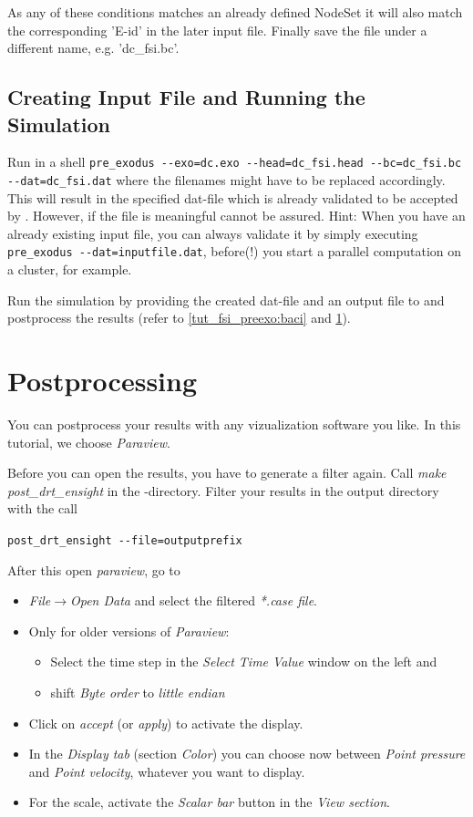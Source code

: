 As any of these conditions matches an already defined NodeSet it will also match the corresponding 'E-id' in the later \baci{} input file.
Finally save the file under a different name, e.g. 'dc\_fsi.bc'.

\subsection{Creating \baci{} Input File and Running the Simulation}
Run in a shell \verb|pre_exodus --exo=dc.exo --head=dc_fsi.head --bc=dc_fsi.bc --dat=dc_fsi.dat| where the filenames might have to be replaced accordingly. This will result in the specified dat-file which is already validated to be accepted by \baci{}. However, if the file is meaningful cannot be assured. Hint: When you have an already existing input file, you can always validate it by simply executing
\verb|pre_exodus --dat=inputfile.dat|, before(!) you start a parallel \baci{} computation on a cluster, for example. \newline 

Run the simulation by providing the created dat-file and an output file to \baci{} and postprocess the results (refer to \ref{tut_fsi_preexo:baci} and \ref{tut_fsi_preexo:postprocess}).

\section{Postprocessing}
\label{tut_fsi_preexo:postprocess}
You can postprocess your results with any vizualization software you like. In this tutorial, we choose \emph{Paraview}. \newline

Before you can open the results, you have to generate a filter again. Call \emph{make post\_drt\_ensight} in the \baci{}-directory.
Filter your results in the output directory with the call 
\begin{center}
	\verb|post_drt_ensight --file=outputprefix|
\end{center}
After this open \emph{paraview}, go to

\begin{itemize}
\item \emph{File$\to$Open Data} and select the filtered \emph{{*}.case
file}.
\item Only for older versions of \emph{Paraview}:
  \begin{itemize}
   \item Select the time step in the \emph{Select Time Value} window on the
left and
   \item shift \emph{Byte order} to \emph{little endian}
  \end{itemize}
\item Click on \emph{accept} (or \emph{apply}) to activate the display.
\item In the \emph{Display tab} (section \emph{Color}) you can choose now
between \emph{Point pressure} and \emph{Point velocity}, whatever
you want to display.
\item For the scale, activate the \emph{Scalar bar} button in the \emph{View
section}.
\end{itemize}
